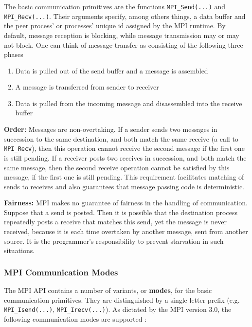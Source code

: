 \documentclass[11pt]{article}
\begin{document}
The basic communication primitives are the functions \texttt{MPI\_Send(...)} and \texttt{MPI\_Recv(...)}.
Their arguments specify, among others things, a data buffer and the peer process' or processes' unique id assigned by the MPI runtime.
By default, message reception is blocking, while message transmission may or may not block.
One can think of message transfer as consisting of the following three phases
\begin{enumerate}
\item Data is pulled out of the send buffer and a message is assembled
\item A message is transferred from sender to receiver
\item Data is pulled from the incoming message and disassembled into the receive buffer
\end{enumerate}

\textbf{Order:}
Messages are non-overtaking.
If a sender sends two messages in succession to the same destination, 
and both match the same receive (a call to \texttt{MPI\_Recv}), 
then this operation cannot receive the second message if the first one is still pending. 
If a receiver posts two receives in succession,
and both match the same message, 
then the second receive operation cannot be satisfied by this message, if the first one is still pending. 
This requirement facilitates matching of sends to receives and also guarantees that message passing code is deterministic.

\textbf{Fairness:}
MPI makes no guarantee of fairness in the handling of communication. 
Suppose that a send is posted. 
Then it is possible that the destination process repeatedly posts a receive that matches this send, 
yet the message is never received, 
because it is each time overtaken by another message, 
sent from another source. 
It is the programmer’s responsibility to prevent starvation in such situations.



\subsubsection{MPI Communication Modes}
\label{sec:org665c1fb}
The MPI API contains a number of variants, or \textbf{modes}, for the basic communication primitives.
They are distinguished by a single letter prefix (e.g. \texttt{MPI\_Isend(...)}, \texttt{MPI\_Irecv(...)}).
As dictated by the MPI version 3.0, the following communication modes are supported \cite{MessagePassingInterfaceForum2012}:
\end{document}
